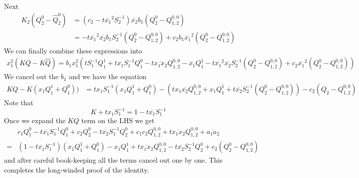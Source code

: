 \documentclass[12pt]{article}
\theoremstyle{definition} \newtheorem{definition}[theorem]{Definition}
\newcommand{\ol}[1]{\overline{#1}}
\newcommand{\wh}{\widehat}
\begin{document}
Next
\begin{align*}
K_2(Q_2^0-\wh{Q}_2^0) &=(c_2 -t\ol{x_1}^2S_2^{-1})\ol{x_2}b_1(Q_2^0-Q_{1,2}^{0,0})\\ 
                                                     &=-t\ol{x_1}^2\ol{x_2}b_1S_2^{-1}(Q_2^0-Q_{1,2}^{0,0})+c_2b_1\ol{x_1}^2(Q_2^0-Q_{1,2}^{0,0})
\end{align*}
We can finally combine these expressions into
\begin{align*}
x_1^2(KQ-K\wh{Q}) = b_1x_1^2(tS_1^{-1}Q_1^1+t\ol{x_1}S_1^{-1}Q_1^0-t\ol{x_1x_2}Q_{1,2}^{0,0}-\ol{x_1}Q_1^1-t\ol{x_1}^2\ol{x_2}S_2^{-1}(Q_2^0-Q_{1,2}^{0,0})+c_2\ol{x_1}^2(Q_2^0-Q_{1,2}^{0,0}))
\end{align*}
We cancel out the $b_1$ and we have the equation
\begin{align*}
KQ-K(x_1Q_1^1+Q_1^0)) &= tx_1S_1^{-1}(x_1Q_1^1+Q_1^0) - (tx_1\ol{x_2}Q_{1,2}^{0,0}+x_1Q_1^1+t\ol{x_2}S_2^{-1}(Q_2^0-Q_{1,2}^{0,0}))-c_2(Q_2-Q_{1,2}^{0,0})
\end{align*}
Note that
\[
  K+tx_1S_1^{-1} = 1- t\ol{x_1}S_1^{-1}
\]
Once we expand the $KQ$ term on the LHS we get
\begin{align*}
&c_1Q_1^0-t\ol{x_1}S_1^{-1}Q_1^0+c_2Q_2^0-t\ol{x_2}S_1^{-1}Q_2^0+c_1c_2Q_{1,2}^{0,0}+t\ol{x_1x_2}Q_{1,2}^{0,0}+\ol{a_1a_2}\\
=&(1-t\ol{x_1}S_1^{-1})(x_1Q_1^1+Q_1^0)-x_1Q_1^1+t\ol{x_1x_2}Q_{1,2}^{0,0}-t\ol{x_2}S_2^{-1}Q_2^0+c_2(Q_2^0-Q_{1,2}^{0,0})
\end{align*}
and after careful book-keeping all the terms cancel out one by one. This completes the long-winded proof of the identity.
\end{document}
